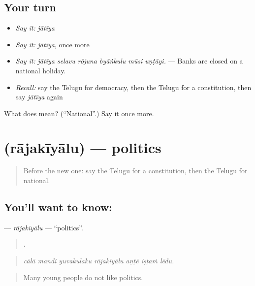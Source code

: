 \subsection*{Your turn}
\begin{itemize}
\raggedright
  \item \emph{Say it:} \emph{jātīya}
  \item \emph{Say it:} \emph{jātīya}, once more
  \item \emph{Say it:} \emph{jātīya selavu rōjuna byāṅkulu mūsi uṇṭāyi.} — Banks are closed on a national holiday.
  \item \emph{Recall:} say the Telugu for democracy, then the Telugu for a constitution, then say \emph{jātīya} again
\end{itemize}

\begin{tcolorbox}[breakable,colback=teal!4,colframe=teal!35!black,title={Before you move on}]
What does  mean? (\textquotedblleft{}National\textquotedblright{}.) Say it once more.
\end{tcolorbox}
\section[\texorpdfstring{\te{రాజకీయాలు} (rājakīyālu)}{రాజకీయాలు (rājakīyālu)}]{ (rājakīyālu) — politics}

\label{lesson:TE-C401-rajakiyalu}



\begin{quote}
Before the new one: say the Telugu for a constitution, then the Telugu for national.
\end{quote}

\subsection*{You'll want to know: }
\textbf{} — \emph{rājakīyālu} — \textquotedblleft{}politics\textquotedblright{}.

\begin{quote}
      .
\end{quote}

\begin{quote}
\emph{cālā mandi yuvakulaku rājakīyālu aṇṭē iṣṭaṁ lēdu.}
\end{quote}

\begin{quote}
Many young people do not like politics.
\end{quote}

